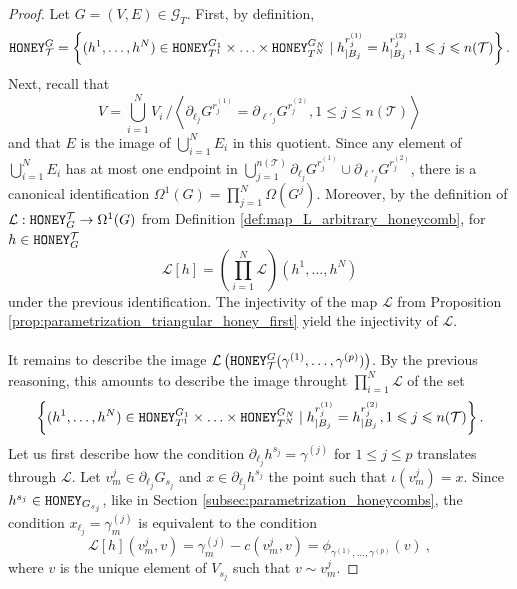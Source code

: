 \documentclass[11pt,a4paper]{amsart}
\providecommand{\honey}{\texttt{\textsc{HONEY}}}
\numberwithin{equation}{section}
\theoremstyle{definition}
\begin{document}
\begin{proof}
    Let $G = (V, E)\in\mathcal{G}_T$. 
    First, by definition, 
    $$\honey_{\mathcal{T}}^G= \left\{(h^1,\ldots,h^N) \in 
    \honey_{T^{1}}^{G_1}\times\ldots\times \honey_{T^N}^{G_N} 
    \mid h^{r_j^{(1)}}_{\vert B_j } = 
    h^{r_j^{(2)}}_{\vert B_j}, 1\leqslant j\leqslant n(\mathcal{T}) \right\}.$$
    Next, recall that  
    $$V=\bigcup_{i=1}^NV_i \, / \left\langle 
    \partial_{\ell_j}G^{r_j^{(1)}}=\partial_{\ell'_j}G^{r_j^{(2)}} 
    , 1\leqslant j\leqslant n(\mathcal{T}) \right\rangle$$ 
    and that $E$ is the image of $\bigcup_{i=1}^N E_i$ 
    in this quotient. 
    Since any element of $\bigcup_{i=1}^N E_i$ has at 
    most one endpoint in $\bigcup_{j=1}^{n(\mathcal{T})} 
    \partial_{\ell_j}G^{r_j^{(1)}} \cup \partial_{\ell'_j}G^{r_j^{(2)}}$, 
    there is a canonical identification 
    $\Omega^1(G)=\prod_{j=1}^N\Omega(G^j)$. 
    Moreover, by the definition of $\mathcal{L}: 
    \honey_G^{\mathcal{T}}\to \Omega^1(G)$ from 
    Definition \ref{def:map_L_arbitrary_honeycomb}, 
    for $h\in \honey_G^{\mathcal{T}}$
    $$\mathcal{L}[h]=\left(\prod_{i=1}^N\mathcal{L}\right)(h^1,\ldots,h^N)$$
    under the previous identification. 
    The injectivity of 
    the map $\mathcal{L}$ from 
    Proposition \ref{prop:parametrization_triangular_honey_first} 
    yield the injectivity of $\mathcal{L}$.
    \\
    \\
    It remains to describe the image 
    $\mathcal{L}\left(\honey_{\mathcal{T}}^G
    (\gamma^{(1)},\ldots,\gamma^{(p)})\right)$. 
    By the previous reasoning, 
    this amounts to describe the image throught
    $\prod_{i=1}^N\mathcal{L}$ of the set
    $$\left\{(h^1,\ldots,h^N) \in 
    \honey_{T^{1}}^{G_1}\times\ldots\times \honey_{T^N}^{G_N} 
    \mid h^{r_j^{(1)}}_{\vert B_j } = 
    h^{r_j^{(2)}}_{\vert B_j}, 1\leqslant j\leqslant n(\mathcal{T}) \right\}.$$
    Let us first describe how the condition 
    $\partial_{\ell_j}h^{s_j}=\gamma^{(j)}$ for 
    $1\leqslant j\leqslant p$ translates through $\mathcal{L}$. 
    Let $v^j_m\in \partial_{\ell_j}G_{s_j}$ and 
    $x\in \partial_{\ell_j}h^{s_j}$ the point such that 
    $\iota(v^j_m) = x$. Since $h^{s_j}\in \honey_{G_{s_j}}$, 
    like in Section \ref{subsec:parametrization_honeycombs}, 
    the condition $x_{\ell_j}=\gamma^{(j)}_m$ is equivalent 
    to the condition 
    $$\mathcal{L}[h](v^j_m,v)=
    \gamma^{(j)}_m-c(v^j_m,v) = \phi_{\gamma^{(1)},\ldots,\gamma^{(p)}}(v) \ ,$$
    where $v$ is the unique element of $V_{s_{j}}$ 
    such that $v\sim v^j_m$.

\end{proof}
\end{document}

